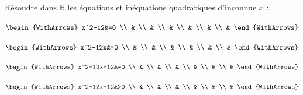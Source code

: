 \documentclass[main.tex]{subfiles}
\begin{document}
\begin{example}Résoudre dans $\mathbb{R}$ les équations et inéquations quadratiques d'inconnue $x$ :
	
	
\noindent
\parbox{0.15\linewidth}{
	\noindent
	$\begin{WithArrows}
		x^2-12&=0  \\
		&    \\
		&  \\
		&  \\
		& \\
		& \\
		& 
	\end{WithArrows}$
} 
\parbox{0.15\linewidth}{
	\noindent
	$\begin{WithArrows}
		x^2-12x&=0 \\
		&  \\
		&  \\
		&   \\
		& \\
		& \\
		&  
	\end{WithArrows}$
}  \hfill 
\parbox{0.3\linewidth}{
	\noindent
	$\begin{WithArrows}
		x^2-12x-12&=0 \\
		&  \\
		&  \\
		& \\
		&  \\
		&  \\
		& 
	\end{WithArrows}$
} \hfill
\parbox{0.25\linewidth}{
	\noindent
	$\begin{WithArrows}
		x^2-12x-12&>0 \\
		&  \\
		&  \\
		& \\
		&  \\
		&  \\
		& 
	\end{WithArrows}$
} 
\vfill 


\end{example}
\end{document}
